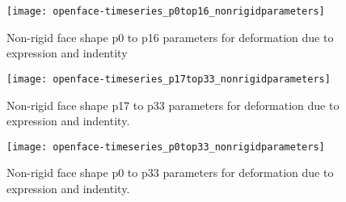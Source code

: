 \documentclass[a4paper,12pt]{article}
\begin{document}
\begin{figure}
\centering
\texttt{[image: openface-timeseries\_p0top16\_nonrigidparameters]}
\caption{Non-rigid face shape p0 to p16 parameters for deformation due to expression and indentity}
\end{figure}

\begin{figure}
\centering
\texttt{[image: openface-timeseries\_p17top33\_nonrigidparameters]}
\caption{Non-rigid face shape  p17 to p33 parameters for deformation due to expression and indentity.}
\end{figure}


\begin{figure}
\centering
\texttt{[image: openface-timeseries\_p0top33\_nonrigidparameters]}
\caption{Non-rigid face shape p0 to p33 parameters for deformation due to expression and indentity.}
\end{figure}





%
\end{document}
